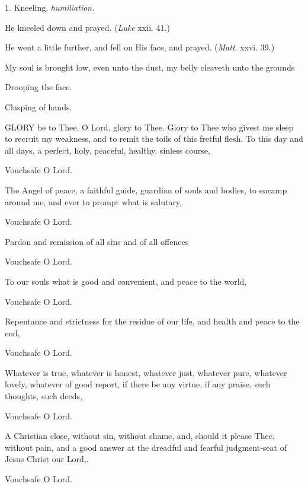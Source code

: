 
1. Kneeling,  \emph{humiliation.}

He kneeled down and prayed. (\emph{Luke }xxii. 41.)

He went a little further, and fell on His face, and prayed. (\emph{Matt}. xxvi. 39.)

My soul is brought low, even unto the dust,  my belly cleaveth unto the grounds

Drooping the face.

Clasping of hands.



GLORY be to Thee, O Lord, glory to Thee.  Glory to Thee who givest me sleep  to recruit my weakness,  and to remit the toils  of this fretful flesh.  To this day and all days,  a perfect, holy, peaceful, healthy,  sinless course,

Vouchsafe O Lord.

The Angel of peace, a faithful guide,  guardian of souls and bodies,  to encamp around me,  and ever to prompt what is salutary,

Vouchsafe O Lord.

Pardon and remission  of all sins and of all offences

Vouchsafe O Lord.

To our souls what is good and convenient,  and peace to the world,

Vouchsafe O Lord.

Repentance and strictness  for the residue of our life,  and health and peace to the end,

Vouchsafe O Lord.

Whatever is true, whatever is honest,  whatever just, whatever pure,  whatever lovely, whatever of good report,  if there be any virtue, if any praise,  such thoughts, such deeds,

Vouchsafe O Lord.

A Christian close,  without sin, without shame,  and, should it please Thee,  without pain,  and a good answer  at the dreadful and fearful  judgment‑seat  of Jesus Christ our Lord,.

Vouchsafe O Lord.



